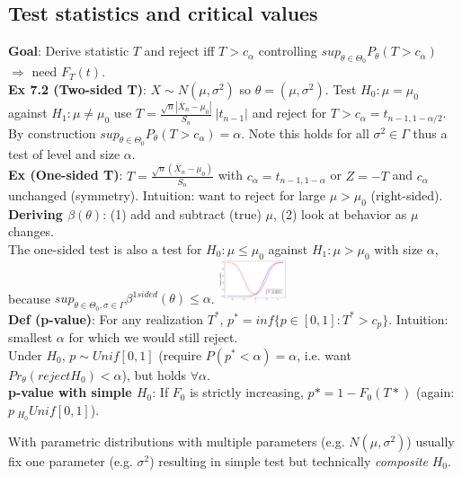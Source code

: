 \subsection{Test statistics and critical values}
\textbf{Goal}: Derive statistic $T$ and reject iff $T>c_\alpha$ controlling $sup_{\theta\in\Theta_0}P_\theta(T>c_\alpha)$ $\Rightarrow$ need $F_T(t)$.\\
\textbf{Ex 7.2 (Two-sided T)}: $X\sim N(\mu, \sigma^2)$ so $\theta = (\mu, \sigma^2)$. Test $H_0:\mu=\mu_0$ against $H_1:\mu\neq\mu_0$ use $T = \frac{\sqrt{n}|\bar{X}_n-\mu_0|}{S_n} ~ |t_{n-1}|$ and reject for $T > c_\alpha = t_{n-1, 1-\alpha/2}$. By construction $sup_{\theta\in\Theta_0}P_\theta(T>c_\alpha)=\alpha$. \footnotesize{Note this holds for all $\sigma^2\in\Gamma$ thus a test of level and size $\alpha$.}\\
\textbf{Ex (One-sided T)}: $T = \frac{\sqrt{n}(\bar{X}_n-\mu_0)}{S_n}$ with $c_\alpha = t_{n-1, 1-\alpha}$ or $Z = -T$ and $c_\alpha$ unchanged (symmetry). Intuition: want to reject for large $\mu > \mu_0$ (right-sided).\\
\textbf{Deriving $\beta(\theta)$}: (1) add and subtract (true) $\mu$, (2) look at behavior as $\mu$ changes. \\
The one-sided test is also a test for $H_0:\mu\leq\mu_0$ against $H_1:\mu>\mu_0$ with size $\alpha$, because $sup_{\theta\in\Theta_0, \sigma\in\Gamma}\beta^{1sided}(\theta)\leq\alpha$.
\includegraphics[width = 0.15\textwidth]{content/power_curves.png}\\
\textbf{Def (p-value)}: For any realization $T^*$, $p^* = inf\{p\in[0,1]: T^*>c_p\}$. Intuition: smallest $\alpha$ for which we would still reject. \\\footnotesize{Under $H_0$, $p\sim Unif[0,1]$ (require $P(p^*<\alpha)=\alpha$, i.e. want $Pr_\theta(reject H_0) < \alpha$), but holds $\forall\alpha$.}\\
\textbf{p-value with simple $H_0$}: If $F_0$ is strictly increasing, $p* = 1 - F_0(T*)$ (again: $p~_{H_0}Unif[0,1]$).

\footnotesize{With parametric distributions with multiple parameters (e.g. $N(\mu, \sigma^2)$) usually fix one parameter (e.g. $\sigma^2$) resulting in simple test but technically \textit{composite} $H_0$.}

